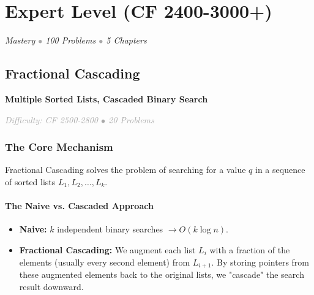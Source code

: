 \documentclass[11pt,a4paper,oneside]{book}
\begin{document}
\newpage


\part{Expert Level (CF 2400-3000+)}

\begin{center}
\begin{tcolorbox}[
    enhanced,
    colback=lightgray,
    colframe=primaryblue,
    boxrule=1.5pt,
    arc=3mm,
    width=0.8\textwidth
]
\centering
\Large\textit{
    \textcolor{deepblue}{Mastery} 
    \textcolor{darkgray}{$\bullet$} 
    \textcolor{accentorange}{100 Problems} 
    \textcolor{darkgray}{$\bullet$} 
    \textcolor{successgreen}{5 Chapters}
}
\end{tcolorbox}
\end{center}


\chapter{Fractional Cascading}

\begin{tcolorbox}[
    enhanced,
    colback=white,
    colframe=secondaryblue,
    boxrule=1pt,
    arc=2mm,
    left=10pt,
    right=10pt
]
\textbf{\large\textcolor{primaryblue}{Multiple Sorted Lists, Cascaded Binary Search}}
\end{tcolorbox}

\vspace{0.5cm}

\begin{center}
\textit{\textcolor{darkgray}{Difficulty: CF 2500-2800 $\bullet$ 20 Problems}}
\end{center}

\section{The Core Mechanism}

Fractional Cascading solves the problem of searching for a value $q$ in a sequence of sorted lists $L_1, L_2, \dots, L_k$. 

\subsection{The Naive vs. Cascaded Approach}
\begin{itemize}
    \item \textbf{Naive:} $k$ independent binary searches $\rightarrow O(k \log n)$.
    \item \textbf{Fractional Cascading:} We augment each list $L_i$ with a fraction of the elements (usually every second element) from $L_{i+1}$. By storing pointers from these augmented elements back to the original lists, we "cascade" the search result downward.
\end{itemize}
\end{document}
